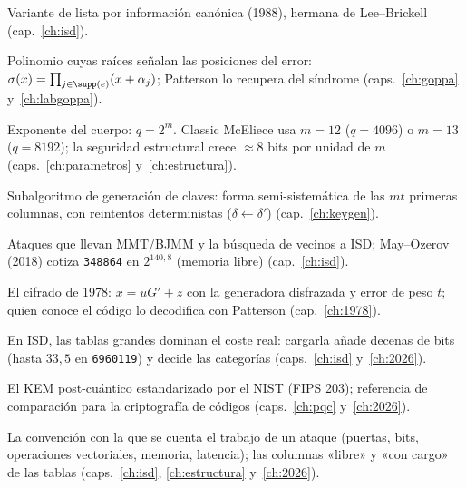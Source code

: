 \begin{description}[leftmargin=2.6em,style=nextline,itemsep=2.5pt,parsep=0pt]
  \item[\textbf{Leon}]
        Variante de lista por información canónica (1988),
        hermana de Lee--Brickell (cap.~\ref{ch:isd}).

  \item[\textbf{Localizador (polinomio $\sigma$)}]
        Polinomio cuyas raíces señalan las posiciones del error:
        $\sigma(x)=\prod_{j\in\supp(e)}(x+\alpha_j)$; Patterson lo
        recupera del síndrome (caps.~\ref{ch:goppa}
        y~\ref{ch:labgoppa}).

  \item[\textbf{$m$}]
        Exponente del cuerpo: $q=2^m$. Classic McEliece usa
        $m=12$ ($q=4096$) o $m=13$ ($q=8192$); la seguridad
        estructural crece $\approx8$ bits por unidad de $m$
        (caps.~\ref{ch:parametros} y~\ref{ch:estructura}).

  \item[\textbf{MatGen}]
        Subalgoritmo de generación de claves: forma
        semi-sistemática de las $mt$ primeras columnas, con
        reintentos deterministas ($\delta\leftarrow\delta'$)
        (cap.~\ref{ch:keygen}).

  \item[\textbf{May--Mezerov / May--Ozerov}]
        Ataques que llevan MMT/BJMM y la búsqueda de vecinos a
        ISD; May--Ozerov (2018) cotiza \texttt{348864} en
        $2^{140{,}8}$ (memoria libre) (cap.~\ref{ch:isd}).

  \item[\textbf{McEliece (criptosistema)}]
        El cifrado de 1978: $x=uG'+z$ con la generadora disfrazada
        y error de peso $t$; quien conoce el código lo decodifica
        con Patterson (cap.~\ref{ch:1978}).

  \item[\textbf{Memoria (coste de la)}]
        En ISD, las tablas grandes dominan el coste real: cargarla
        añade decenas de bits (hasta $33{,}5$ en \texttt{6960119})
        y decide las categorías (caps.~\ref{ch:isd}
        y~\ref{ch:2026}).

  \item[\textbf{ML-KEM}]
        El KEM post-cuántico estandarizado por el NIST (FIPS 203);
        referencia de comparación para la criptografía de códigos
        (caps.~\ref{ch:pqc} y~\ref{ch:2026}).

  \item[\textbf{Modelo de costes}]
        La convención con la que se cuenta el trabajo de un ataque
        (puertas, bits, operaciones vectoriales, memoria,
        latencia); las columnas «libre» y «con cargo» de las
        tablas (caps.~\ref{ch:isd}, \ref{ch:estructura}
        y~\ref{ch:2026}).


\end{description}
